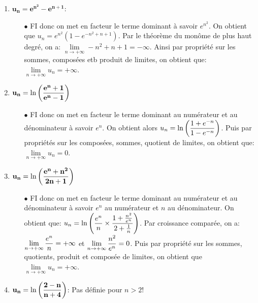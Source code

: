 \documentclass[a4paper, 11pt]{article}
\begin{document}
\begin{correction}
\begin{enumerate}
\item $\mathbf{u_n=e^{n^2}-e^{n+1}}$:
\begin{itemize}
\item[$\bullet$]  FI donc on met en facteur le terme dominant \`{a} savoir $e^{n^2}$. On obtient que $u_n=e^{n^2}(1-e^{-n^2+n+1})$. Par le th\'eor\`{e}me du mon\^{o}me de plus haut degr\'e, on a: $\lim\limits_{n\to +\infty} -n^2+n+1=-\infty$. Ainsi par propri\'et\'e sur les sommes, compos\'ees etb produit de limites, on obtient que: $\lim\limits_{n\to +\infty} u_n=+\infty$.
\end{itemize} 
\item $\mathbf{u_n=\ln{\left(\displaystyle\frac{e^n+1}{e^n-1}\right)}}$
\begin{itemize}
\item[$\bullet$]  FI donc on met en facteur le terme dominant au num\'erateur et au d\'enominateur \`{a} savoir $e^n$. On obtient alors $u_n=\ln{\left( \displaystyle\frac{1+e^{-n}}{1-e^{-n}}  \right)}$. Puis par propri\'et\'es sur les compos\'ees, sommes, quotient de limites, on obtient que: $\lim\limits_{n\to +\infty} u_n=0$. 
\end{itemize} 
\item $\mathbf{u_n=\ln{\left(\displaystyle\frac{e^n+n^2}{2n+1}\right)}}$
\begin{itemize}

\item[$\bullet$]  FI donc on met en facteur le terme dominant au num\'erateur et au d\'enominateur \`{a} savoir $e^n$ au num\'erateur et $n$ au d\'enominateur. On obtient que: $u_n=\ln{\left( \displaystyle\frac{e^n}{n}\times \displaystyle\frac{1+\frac{n^2}{e^n}}{2+\frac{1}{n}}  \right)}$. Par croissance compar\'ee, on a: $\lim\limits_{n\to +\infty}  \displaystyle\frac{e^n}{n}=+\infty$ et  
$\lim\limits_{n\to +\infty}  \displaystyle\frac{n^2}{e^n}=0$. Puis par propri\'et\'e sur les sommes, quotients, produit et compos\'ee de limites, on obtient que $\lim\limits_{n\to +\infty} u_n=+\infty$.
\end{itemize} 
\item  $\mathbf{u_n=\ln{\left(\displaystyle\frac{2-n}{n+4}\right)}}$:
Pas définie pour $n>2 !$


\end{enumerate}
\end{correction}
\end{document}

